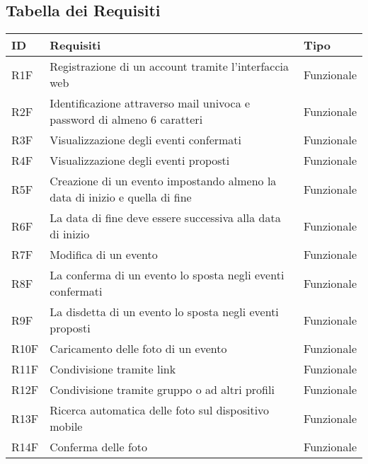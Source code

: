 \subsection{Tabella dei Requisiti}

\begin{tabular} {|P{1.3cm}|P{11.2cm}|P{3cm}|}
  \hline
  \textbf{ID} & \textbf{Requisiti}                                                          & \textbf{Tipo}  \\
  \hline
  R1F         & Registrazione di un account tramite l’interfaccia web                       & Funzionale     \\
  \hline
  R2F         & Identificazione attraverso mail univoca e password di almeno 6 caratteri    & Funzionale     \\
  \hline
  R3F         & Visualizzazione degli eventi confermati                                     & Funzionale     \\
  \hline
  R4F         & Visualizzazione degli eventi proposti                                       & Funzionale     \\
  \hline
  R5F         & Creazione di un evento impostando almeno la data di inizio e quella di fine & Funzionale     \\
  \hline
  R6F         & La data di fine deve essere successiva alla data di inizio                  & Funzionale     \\
  \hline
  R7F         & Modifica di un evento                                                       & Funzionale     \\
  \hline
  R8F         & La conferma di un evento lo sposta negli eventi confermati                  & Funzionale     \\
  \hline
  R9F         & La disdetta di un evento lo sposta negli eventi proposti                    & Funzionale     \\
  \hline
  R10F        & Caricamento delle foto di un evento                                         & Funzionale     \\
  \hline
  R11F        & Condivisione tramite link                                                   & Funzionale     \\
  \hline
  R12F        & Condivisione tramite gruppo o ad altri profili                              & Funzionale     \\
  \hline
  R13F        & Ricerca automatica delle foto sul dispositivo mobile                        & Funzionale     \\
  \hline
  R14F        & Conferma delle foto                                                         & Funzionale     \\

\end{tabular}
